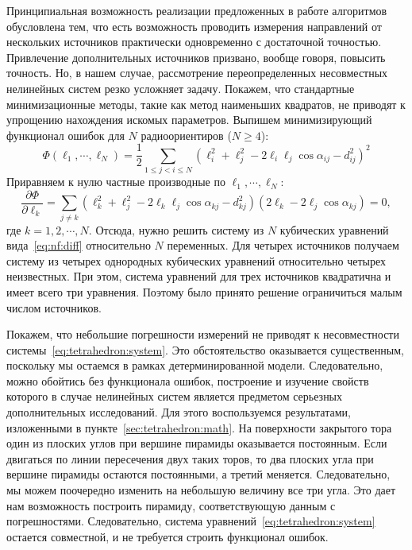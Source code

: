 \documentclass[../main.tex]{subfiles}
\begin{document}
Принципиальная возможность реализации предложенных в работе алгоритмов обусловлена тем, что есть возможность проводить измерения направлений от нескольких источников практически одновременно с достаточной точностью. Привлечение дополнительных источников призвано, вообще говоря, повысить точность. Но, в нашем случае, рассмотрение переопределенных несовместных нелинейных систем резко усложняет задачу. Покажем, что стандартные минимизационные методы, такие как метод наименьших квадратов, не приводят к упрощению нахождения искомых параметров. Выпишем минимизирующий функционал ошибок для $N$ радиоориентиров ($N \geq 4$):
\begin{equation*}
    \Phi\left(\ell_1, \cdots, \ell_N \right) = \frac{1}{2}\sum_{1 \leq j < i \leq N} \left(\ell_i^2 + \ell_j^2 - 2 \ell_i \ell_j \cos\alpha_{ij} - d_{ij}^2\right)^2
\end{equation*}
Приравняем к нулю частные производные по $\ell_1, \cdots, \ell_N$:
\begin{equation}\label{eq:nf:diff}
      \frac{\partial\Phi}{\partial\ell_k} = \sum_{j \ne k} \left(\ell_k^2 + \ell_j^2 - 2 \ell_k \ell_j \cos\alpha_{kj} - d_{kj}^2\right)\left(2 \ell_k - 2 \ell_j \cos\alpha_{kj}\right) = 0,
\end{equation}
где $k = 1, 2, \cdots, N$. Отсюда, нужно решить систему из $N$ кубических уравнений вида~\eqref{eq:nf:diff} относительно $N$ переменных. Для четырех источников получаем систему из четырех однородных кубических уравнений относительно четырех неизвестных. При этом, система уравнений для трех источников квадратична и имеет всего три уравнения. Поэтому было принято решение ограничиться малым числом источников.

Покажем, что небольшие погрешности измерений не приводят к несовместности системы~\eqref{eq:tetrahedron:system}. Это обстоятельство оказывается существенным, поскольку мы остаемся в рамках детерминированной модели. Следовательно, можно обойтись без функционала ошибок, построение и изучение свойств которого в случае нелинейных систем является предметом серьезных дополнительных исследований. Для этого воспользуемся результатами, изложенными в пункте~\ref{sec:tetrahedron:math}. На поверхности закрытого тора один из плоских углов при вершине пирамиды оказывается постоянным. Если двигаться по линии пересечения двух таких торов, то два плоских угла при вершине пирамиды остаются постоянными, а третий меняется. Следовательно, мы можем поочередно изменить на небольшую величину все три угла. Это дает нам возможность построить пирамиду, соответствующую данным с погрешностями. Следовательно, система уравнений~\eqref{eq:tetrahedron:system} остается совместной, и не требуется строить функционал ошибок.
\end{document}
